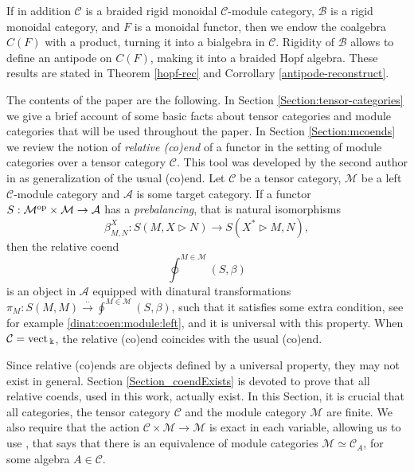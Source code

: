 \documentclass[11pt]{amsart}
\newcommand{\Mo}{{\mathcal M}}
\newcommand{\ca}{{\mathcal C}}
\newcommand{\op}{\rm{op}}
\newcommand{\Ac}{{\mathcal A}}
\newcommand{\vc}{{\mathcal C}}
\newcommand{\Bc}{{\mathcal B}}
\newcommand{\ku}{{\Bbbk}}
\newcommand{\vect}{\mbox{\rm vect\,}}
\renewcommand{\_}[1]{\mbox{$_{\left( #1 \right)}$}}
\theoremstyle{plain}
\numberwithin{equation}{section}
\theoremstyle{definition}
\theoremstyle{remark}
\theoremstyle{introTheorems}
\begin{document}
If in addition $\vc$ is a braided rigid monoidal  $\vc$-module category,  $\Bc$ is a rigid monoidal category, and $F$ is a monoidal functor, then we endow the coalgebra $C(F)$ with a product, turning it into a bialgebra in $\vc$. Rigidity of $\Bc$ allows to define an antipode on $C(F)$, making it into a braided Hopf algebra. These results are stated in Theorem \ref{hopf-rec} and Corrollary \ref{antipode-reconstruct}.

\medbreak 

The contents of the paper are the following. In Section \ref{Section:tensor-categories} we give a brief account of some basic facts about tensor categories and module categories that will be used throughout the paper. In Section \ref{Section:mcoends} we review the notion of  \emph{relative (co)end} of a functor  in the setting of module categories over a tensor category $\ca$. This tool was developed by the second author in \cite{BM} as generalization of the usual (co)end. 
Let $\ca$ be a tensor category, $\Mo$ be a left $\vc$-module category and $\Ac$ is some target category. If a functor 
$S:\Mo^{\op}\times \Mo\to \Ac$ has a \textit{prebalancing}, that is natural isomorphisms
$$\beta^X_{M,N}: S(M,X\triangleright N)\to S(X^*\triangleright M,N),$$
then the relative coend 
$$\oint^{M\in \Mo} (S,\beta)$$
is an object in $ \Ac$ equipped with dinatural transformations $\pi_M:S(M,M)\xrightarrow{ . .} \oint^{M\in \Mo} (S,\beta)$, such that it satisfies some extra condition, see for example \eqref{dinat:coen:module:left}, and it is universal with this property. When $\ca=\vect_\ku$, the relative (co)end coincides with the usual (co)end. 

\medbreak

Since relative (co)ends are objects defined by a universal property, they may not exist in general. Section \ref{Section_coendExists} is devoted to prove that all relative coends, used in this work, actually exist. In this Section, it is crucial that all categories, the tensor category $\vc$ and the module category $\Mo$ are finite. We also require that the action $ \vc\times \Mo\to \Mo$ is exact in each variable, allowing us to use \cite[Thm 2.24]{DSS}, that says that there is an equivalence of module categories $\Mo\simeq \vc_A$, for some algebra $A\in \vc.$

\medbreak
\end{document}
